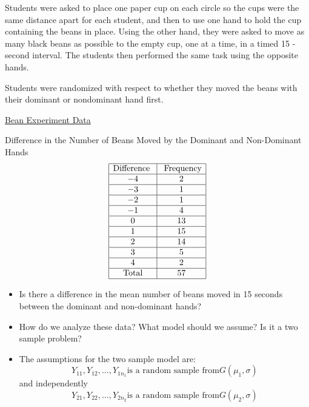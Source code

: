 Students were asked to place one paper cup on each circle so the cups were the same distance
apart for each student, and then to use one hand to hold the cup containing the beans in place.
Using the other hand, they were asked to move as many black beans as possible to the empty
cup, one at a time, in a timed 15 -second interval. The students then performed the same
task using the opposite hands.

Students were randomized with respect to whether they moved the beans with
their dominant or nondominant hand first.

\underline{Bean Experiment Data}

Difference in the Number of Beans Moved by the Dominant and
Non-Dominant Hands
\[ \begin{array}{|c|c|}
        \hline
        \text{Difference } & \text{ Frequency} \\
        \hline
        -4                 & 2                 \\
        \hline
        -3                 & 1                 \\
        \hline
        -2                 & 1                 \\
        \hline
        -1                 & 4                 \\
        \hline
        0                  & 13                \\
        \hline
        1                  & 15                \\
        \hline
        2                  & 14                \\
        \hline
        3                  & 5                 \\
        \hline
        4                  & 2                 \\
        \hline
        \text{Total}       & 57                \\
        \hline
    \end{array} \]
\begin{itemize}
    \item Is there a difference in the mean number of beans moved in 15 seconds between the dominant and non-dominant hands?
    \item How do we analyze these data? What model should we assume? Is it a two sample problem?
    \item The assumptions for the two sample model are:
          \[Y_{11}, Y_{12}, \ldots, Y_{1 n_{1}} \text{is a random sample from} G\left(\mu_{1}, \sigma\right)\]
          and independently
          \[Y_{21}, Y_{22}, \ldots, Y_{2 n_{2}} \text{is a random sample from} G\left(\mu_{2}, \sigma\right)\]
\end{itemize}

